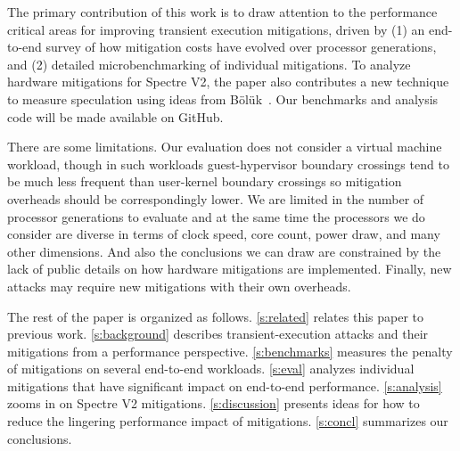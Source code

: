 The primary contribution of this work is to draw attention to the
performance critical areas for improving transient execution
mitigations, driven by (1) an end-to-end survey of how mitigation
costs have evolved over processor generations, and (2) detailed
microbenchmarking of individual mitigations.  To analyze hardware
mitigations for Spectre V2, the paper also contributes a new technique to measure
speculation using ideas from Bölük~\cite{speculating-x86}.
Our benchmarks and analysis code will be made available on GitHub.


There are some limitations.
Our evaluation does not consider a virtual machine workload, though in such workloads guest-hypervisor boundary crossings tend to be much less frequent than user-kernel boundary crossings so mitigation overheads should be correspondingly lower.
We are limited in the number of processor generations to evaluate and at the same time the processors we do consider are diverse in terms of clock speed, core count, power draw, and many other dimensions.
And also the conclusions we can draw are constrained by the lack of
public details on how hardware mitigations are implemented.  Finally,
new attacks may require new mitigations with their own overheads.

The rest of the paper is organized as follows.  \autoref{s:related}
relates this paper to previous work.  \autoref{s:background} describes
transient-execution attacks and their mitigations from a performance
perspective. \autoref{s:benchmarks} measures the penalty of
mitigations on several end-to-end workloads. \autoref{s:eval} analyzes
individual mitigations that have significant impact on end-to-end
performance. \autoref{s:analysis} zooms in on Spectre V2 mitigations.
\autoref{s:discussion} presents ideas for how to reduce the lingering
performance impact of mitigations.  \autoref{s:concl} summarizes our
conclusions.






